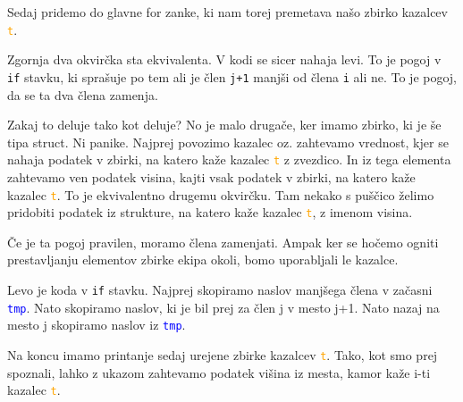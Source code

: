 \documentclass[a4paper, 12pt]{article}
\begin{document}
Sedaj pridemo do glavne for zanke, ki nam torej premetava našo zbirko kazalcev \textcolor{orange}{\texttt{t}}.\

{\centering
{}
\par
}

Zgornja dva okvirčka sta ekvivalenta. V kodi se sicer nahaja levi. To je pogoj v \lstinline|if| stavku, ki sprašuje po tem ali je člen \texttt{j+1} manjši od člena \texttt{i} ali ne. To je pogoj, da se ta dva člena zamenja.\

Zakaj to deluje tako kot deluje? No je malo drugače, ker imamo zbirko, ki je še tipa struct. Ni panike. Najprej povozimo kazalec oz. zahtevamo vrednost, kjer se nahaja podatek v zbirki, na katero kaže kazalec \textcolor{orange}{\texttt{t}} z zvezdico. In iz tega elementa zahtevamo ven podatek visina, kajti vsak podatek v zbirki, na katero kaže kazalec \textcolor{orange}{\texttt{t}}. To je ekvivalentno drugemu okvirčku. Tam nekako s puščico želimo pridobiti podatek iz strukture, na katero kaže kazalec \textcolor{orange}{\texttt{t}}, z imenom visina.\

Če je ta pogoj pravilen, moramo člena zamenjati. Ampak ker se hočemo ogniti prestavljanju elementov zbirke ekipa okoli, bomo uporabljali le kazalce. 

\begin{minipage}{0.75\textwidth}
Levo je koda v \lstinline|if| stavku. Najprej skopiramo naslov manjšega člena v začasni \textcolor{blue}{\texttt{tmp}}. Nato skopiramo naslov, ki je bil prej za člen j v mesto j+1. Nato nazaj na mesto j skopiramo naslov iz \textcolor{blue}{\texttt{tmp}}.
\end{minipage}



Na koncu imamo printanje sedaj urejene zbirke kazalcev \textcolor{orange}{\texttt{t}}. Tako, kot smo prej spoznali, lahko z ukazom  zahtevamo podatek višina iz mesta, kamor kaže i-ti kazalec \textcolor{orange}{\texttt{t}}.

\pagebreak
\end{document}
